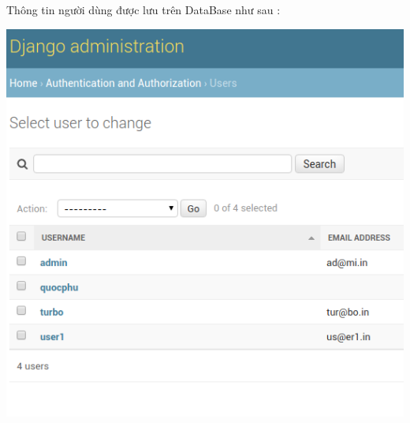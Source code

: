 \documentclass[a4paper]{article}
\begin{document}
\begin{itemize}
\begin{center}
			\end{center}
		Thông tin người dùng được lưu trên DataBase như sau : 
			\begin{center}
				\includegraphics[scale=0.7]{Images/userdata.png}
			\end{center}
		

\end{itemize}
\end{document}

